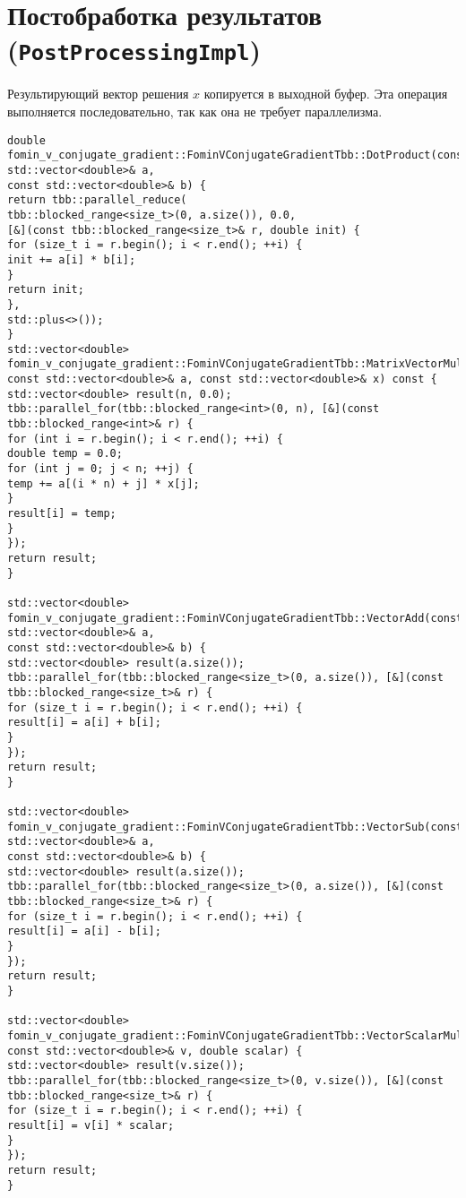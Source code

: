 \documentclass[12pt]{article}
\begin{document}
\section{Постобработка результатов (\texttt{PostProcessingImpl})}
Результирующий вектор решения \( x \) копируется в выходной буфер. Эта операция выполняется последовательно, так как она не требует параллелизма.
\begin{verbatim}
double fomin_v_conjugate_gradient::FominVConjugateGradientTbb::DotProduct(const std::vector<double>& a,
const std::vector<double>& b) {
return tbb::parallel_reduce(
tbb::blocked_range<size_t>(0, a.size()), 0.0,
[&](const tbb::blocked_range<size_t>& r, double init) {
for (size_t i = r.begin(); i < r.end(); ++i) {
init += a[i] * b[i];
}
return init;
},
std::plus<>());
}
std::vector<double> fomin_v_conjugate_gradient::FominVConjugateGradientTbb::MatrixVectorMultiply(
const std::vector<double>& a, const std::vector<double>& x) const {
std::vector<double> result(n, 0.0);
tbb::parallel_for(tbb::blocked_range<int>(0, n), [&](const tbb::blocked_range<int>& r) {
for (int i = r.begin(); i < r.end(); ++i) {
double temp = 0.0;
for (int j = 0; j < n; ++j) {
temp += a[(i * n) + j] * x[j];
}
result[i] = temp;
}
});
return result;
}

std::vector<double> fomin_v_conjugate_gradient::FominVConjugateGradientTbb::VectorAdd(const std::vector<double>& a,
const std::vector<double>& b) {
std::vector<double> result(a.size());
tbb::parallel_for(tbb::blocked_range<size_t>(0, a.size()), [&](const tbb::blocked_range<size_t>& r) {
for (size_t i = r.begin(); i < r.end(); ++i) {
result[i] = a[i] + b[i];
}
});
return result;
}

std::vector<double> fomin_v_conjugate_gradient::FominVConjugateGradientTbb::VectorSub(const std::vector<double>& a,
const std::vector<double>& b) {
std::vector<double> result(a.size());
tbb::parallel_for(tbb::blocked_range<size_t>(0, a.size()), [&](const tbb::blocked_range<size_t>& r) {
for (size_t i = r.begin(); i < r.end(); ++i) {
result[i] = a[i] - b[i];
}
});
return result;
}

std::vector<double> fomin_v_conjugate_gradient::FominVConjugateGradientTbb::VectorScalarMultiply(
const std::vector<double>& v, double scalar) {
std::vector<double> result(v.size());
tbb::parallel_for(tbb::blocked_range<size_t>(0, v.size()), [&](const tbb::blocked_range<size_t>& r) {
for (size_t i = r.begin(); i < r.end(); ++i) {
result[i] = v[i] * scalar;
}
});
return result;
}
\end{verbatim}
\end{document}

